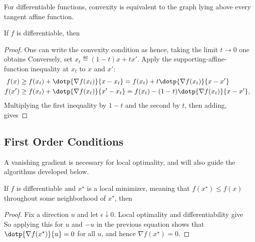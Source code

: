 For differentiable functions, convexity is equivalent to the graph lying above every tangent affine function.

\begin{prop}\label{prop-above-tgt}
	If $f$ is differentiable, then
\end{prop}
\begin{proof}
	One can write the convexity condition as
	hence, taking the limit $t \rightarrow 0$ one obtains
	Conversely, set $x_t\eqdef(1-t)x+tx'$. Apply the supporting-affine-function inequality at $x_t$ to $x$ and $x'$:
	\begin{align*}
		f(x)  & \geq f(x_t) + \dotp{\nabla f(x_t)}{x-x_t} =f(x_t)+t\dotp{\nabla f(x_t)}{x-x'} \\
		f(x') & \geq f(x_t) + \dotp{\nabla f(x_t)}{x'-x_t} =f(x_t)-(1-t)\dotp{\nabla f(x_t)}{x-x'},
	\end{align*}
	Multiplying the first inequality by $1-t$ and the second by $t$, then adding, gives
\end{proof}


                                                                                  
\subsection{First Order Conditions}

A vanishing gradient is necessary for local optimality, and will also guide the algorithms developed below.

\begin{prop}\label{prop-cs-min} 
If $f$ is differentiable and $x^\star$ is a local minimizer, meaning that $f(x^\star)\leq f(x)$ throughout some neighborhood of $x^\star$, then
\end{prop}
\begin{proof}
Fix a direction $u$ and let $\epsilon\downarrow0$. Local optimality and differentiability give
So applying this for $u$ and $-u$ in the previous equation shows that $\dotp{\nabla f(x^\star)}{u}=0$ for all $u$, and hence $\nabla f(x^\star)=0$.
\end{proof}

